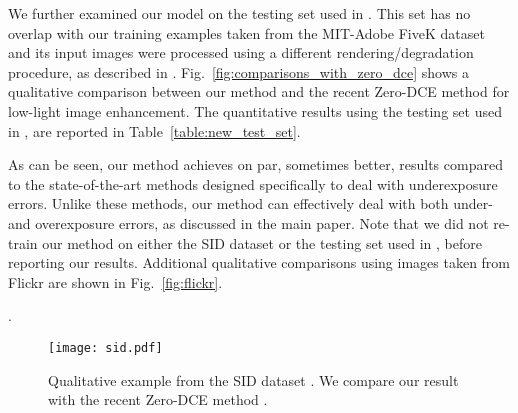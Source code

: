 \documentclass[final]{cvpr}
\begin{document}
We further examined our model on the testing set used in \cite{DeepUPE}. This set has no overlap with our training examples taken from the MIT-Adobe FiveK dataset \cite{fivek} and its input images were processed using a different rendering/degradation procedure, as described in \cite{DeepUPE}. Fig.\ \ref{fig:comparisons_with_zero_dce} shows a qualitative comparison between our method and the recent Zero-DCE method \cite{guo2020zero} for low-light image enhancement. The quantitative results using the testing set used in \cite{DeepUPE}, are reported in Table\ \ref{table:new_test_set}. 

As can be seen, our method achieves on par, sometimes better, results compared to the state-of-the-art methods designed specifically to deal with underexposure errors. Unlike these methods, our method can effectively deal with both under- and overexposure errors, as discussed in the main paper. Note that we did not re-train our method on either the SID dataset or the testing set used in \cite{DeepUPE}, before reporting our results.  Additional qualitative comparisons using images taken from Flickr are shown in Fig.\ \ref{fig:flickr}.



\begin{table}[]
\caption{Comparison with other methods for low-light image enhancement using the test set used in \cite{DeepUPE}. \label{table:new_test_set}}.
\centering
{}
\end{table}



\begin{figure*}
\centering
\texttt{[image: sid.pdf]}
\vspace{-2mm}
\caption{Qualitative example from the SID dataset \cite{chen2018learning}. We compare our result with the recent Zero-DCE method \cite{guo2020zero}. \vspace{-2mm}}
\label{fig:sid}
\end{figure*}
\end{document}
